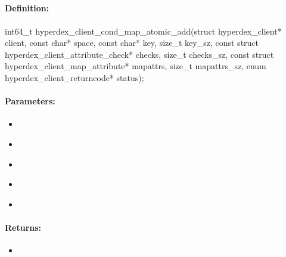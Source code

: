 \pagebreak
\subsection{}
\label{api:c:cond_map_atomic_add}


\paragraph{Definition:}
\begin{ccode}
int64_t hyperdex_client_cond_map_atomic_add(struct hyperdex_client* client,
        const char* space,
        const char* key, size_t key_sz,
        const struct hyperdex_client_attribute_check* checks, size_t checks_sz,
        const struct hyperdex_client_map_attribute* mapattrs, size_t mapattrs_sz,
        enum hyperdex_client_returncode* status);
\end{ccode}

\paragraph{Parameters:}
\begin{itemize}[noitemsep]
\item {}\\

\item {}\\

\item {}\\

\item {}\\

\item {}\\

\end{itemize}

\paragraph{Returns:}
\begin{itemize}[noitemsep]
\item {}\\

\end{itemize}

